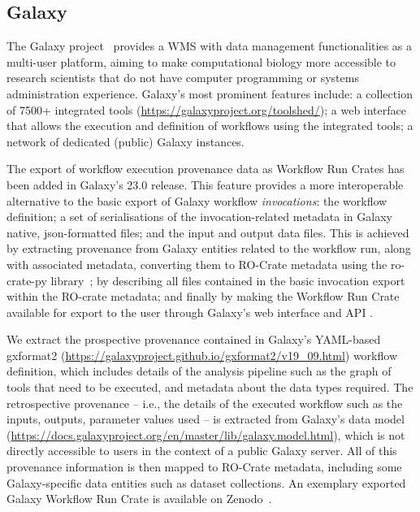 \documentclass[10pt,letterpaper]{article}
\begin{document}
\subsection{Galaxy}\label{galaxy}

The Galaxy project~\cite{Galaxy 2022} provides a WMS with data management functionalities as a multi-user platform, aiming to make computational biology more accessible to research scientists that do not have computer programming or systems administration experience.
Galaxy's most prominent features include: a collection of 7500+ integrated tools (\url{https://galaxyproject.org/toolshed/});
a web interface that allows the execution and definition of workflows using the integrated tools; a network of dedicated (public) Galaxy instances.

The export of workflow execution provenance data as Workflow Run Crates has been added in Galaxy's 23.0 release.
This feature provides a more interoperable alternative to the basic export of Galaxy workflow
\emph{invocations}: the workflow definition; a set of serialisations of the invocation-related metadata in Galaxy native, json-formatted files;
and the input and output data files.
This is achieved by extracting provenance from Galaxy entities related to the workflow run, along with associated metadata, converting them to RO-Crate metadata using the ro-crate-py library~\cite{De Geest 2022a}; by describing all files contained in the basic invocation export within the RO-crate metadata;
and finally by making the Workflow Run Crate available for export to the user through Galaxy's web interface and API \cite{De Geest 2022b}.

We extract the prospective provenance contained in Galaxy's YAML-based gxformat2
(\url{https://galaxyproject.github.io/gxformat2/v19_09.html}) workflow definition, which includes details of the analysis pipeline such as the graph of tools that need to be executed, and metadata about the data types required.
The retrospective provenance -- i.e., the details of the executed workflow such as the inputs, outputs, parameter values used -- is extracted from Galaxy's data model (\url{https://docs.galaxyproject.org/en/master/lib/galaxy.model.html}), which is not directly accessible to users in the context of a public Galaxy server.
All of this provenance information is then mapped to RO-Crate metadata, including some Galaxy-specific data entities such as dataset collections.
An exemplary exported Galaxy Workflow Run Crate is available on Zenodo~\cite{De Geest 2023}.
\end{document}
